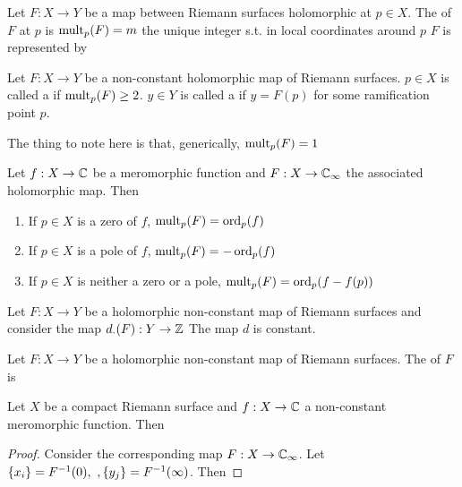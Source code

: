 \documentclass{article}
\begin{document}
\begin{definition}
	Let $F:X \to Y$ be a map between Riemann surfaces holomorphic at $p \in X$. The  of $F$ at $p$ is $\operatorname{mult}_p(F)=m$ the unique integer s.t. in local coordinates around $p$ $F$ is represented by 
\end{definition}

\begin{definition}
	Let $F:X \to Y$ be a non-constant holomorphic map of Riemann surfaces. $p \in X$ is called a  if $\operatorname{mult}_p(F) \geq 2$. $y\in Y$ is called a  if $y=F(p)$ for some ramification point $p$. 
\end{definition}

\begin{remark}
	The thing to note here is that, generically, $\operatorname{mult}_p(F) = 1$ 
\end{remark}

\begin{prop}
	Let $f:X \to \mathbb{C}$ be a meromorphic function and $F:X \to \mathbb{C}_\infty$ the associated holomorphic map. Then 
	\begin{enumerate}
		\item If $p \in X$ is a zero of $f$, $\operatorname{mult}_p(F) = \operatorname{ord}_p(f)$
		\item If $p \in X$ is a pole of $f$, $\operatorname{mult}_p(F) = -\operatorname{ord}_p(f)$
		\item If $p \in X$ is neither a zero or a pole, $\operatorname{mult}_p(F) = \operatorname{ord}_p(f-f(p))$
	\end{enumerate}
\end{prop}

\begin{prop}
	Let $F:X \to Y$ be a holomorphic non-constant map of Riemann surfaces and consider the map $d_{\cdot}(F):Y \to \mathbb{Z}$ 
	The map $d$ is constant. 
\end{prop}

\begin{definition}
	Let $F:X \to Y$ be a holomorphic non-constant map of Riemann surfaces. The  of $F$ is 
\end{definition}

\begin{prop}
	Let $X$ be a compact Riemann surface and $f:X \to \mathbb{C}$ a non-constant meromorphic function. Then 
\end{prop}
\begin{proof}
	Consider the corresponding map $F: X \to \mathbb{C}_\infty$. Let $\left\{ x_i \right\} = F^{-1}(0), \ ,\left\{ y_j \right\} = F^{-1}(\infty)$. Then 
\end{proof}
\end{document}
